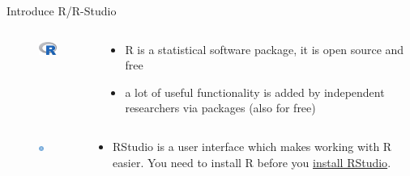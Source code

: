 \documentclass[
  ignorenonframetext,
]{beamer}
\begin{document}
\begin{frame}{Introduce R/R-Studio}
\label{introduce-rr-studio}
\begin{columns}
  
  \begin{column}{0.2\textwidth}
    \begin{figure}
        \centering
        \includegraphics[width=2cm]{Rimage.jpeg}\\
    \end{figure}

  \end{column}
  \begin{column}{0.8\textwidth}
    \begin{itemize}
      \item R is a statistical software package, it is open source and free 
      \item a lot of useful functionality is added by independent researchers via packages (also for free)
    \end{itemize}
  \end{column}
    
\end{columns}

\begin{columns}
  
  \begin{column}{0.2\textwidth}
    \begin{figure}
        \centering
        \includegraphics[width=2cm]{RStudio_image.png}\\
    \end{figure}

  \end{column}
  \begin{column}{0.8\textwidth}
    \begin{itemize}
      \item RStudio is a user interface which makes working with R easier. You need to install R before you \href{https://youtu.be/EHjakj38Nnw}{install RStudio}. 
    \end{itemize}
    

\end{column}
\end{columns}
\end{frame}
\end{document}
